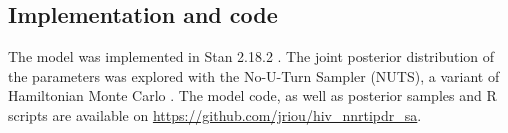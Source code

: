 \documentclass{article}
\begin{document}
	
	\subsection{Implementation and code}
	
	The model was implemented in Stan 2.18.2 \cite{carpenter2017stan}.
	The joint posterior distribution of the parameters was explored with the No-U-Turn Sampler (NUTS), a variant of Hamiltonian Monte Carlo \cite{hoffman2014no}.
	The model code, as well as posterior samples and R scripts are available on \url{https://github.com/jriou/hiv_nnrtipdr_sa}.
	
	
	
	
	  
	
	
\end{document}
